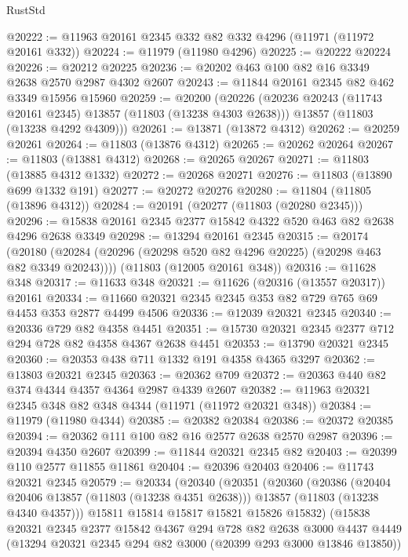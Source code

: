 \begin{lexlean}{RustStd}
\begin{coremodule}
@20222 := @11963 @20161 @2345 @332 @82 @332 @4296 (@11971 (@11972 @20161 @332))
@20224 := @11979 (@11980 @4296)
@20225 := @20222 @20224
@20226 := @20212 @20225
@20236 := @20202 @463 @100 @82 @16 @3349 @2638 @2570 @2987 @4302 @2607
@20243 := @11844 @20161 @2345 @82 @462 @3349 @15956 @15960
@20259 := @20200
    (@20226
      (@20236 @20243 (@11743 @20161 @2345) @13857 (@11803 (@13238 @4303 @2638)))
      @13857
      (@11803 (@13238 @4292 @4309)))
@20261 := @13871 (@13872 @4312)
@20262 := @20259 @20261
@20264 := @11803 (@13876 @4312)
@20265 := @20262 @20264
@20267 := @11803 (@13881 @4312)
@20268 := @20265 @20267
@20271 := @11803 (@13885 @4312 @1332)
@20272 := @20268 @20271
@20276 := @11803 (@13890 @699 @1332 @191)
@20277 := @20272 @20276
@20280 := @11804 (@11805 (@13896 @4312))
@20284 := @20191 (@20277 (@11803 (@20280 @2345)))
@20296 := @15838 @20161 @2345 @2377 @15842 @4322 @520 @463 @82 @2638 @4296 @2638 @3349
@20298 := @13294 @20161 @2345
@20315 := @20174
    (@20180 (@20284 (@20296 (@20298 @520 @82 @4296 @20225) (@20298 @463 @82 @3349 @20243))))
    (@11803 (@12005 @20161 @348))
@20316 := @11628 @348
@20317 := @11633 @348
@20321 := @11626 (@20316 (@13557 @20317)) @20161
@20334 := @11660 @20321 @2345 @2345 @353 @82 @729 @765 @69 @4453 @353 @2877 @4499 @4506
@20336 := @12039 @20321 @2345
@20340 := @20336 @729 @82 @4358 @4451
@20351 := @15730 @20321 @2345 @2377 @712 @294 @728 @82 @4358 @4367 @2638 @4451
@20353 := @13790 @20321 @2345
@20360 := @20353 @438 @711 @1332 @191 @4358 @4365 @3297
@20362 := @13803 @20321 @2345
@20363 := @20362 @709
@20372 := @20363 @440 @82 @374 @4344 @4357 @4364 @2987 @4339 @2607
@20382 := @11963 @20321 @2345 @348 @82 @348 @4344 (@11971 (@11972 @20321 @348))
@20384 := @11979 (@11980 @4344)
@20385 := @20382 @20384
@20386 := @20372 @20385
@20394 := @20362 @111 @100 @82 @16 @2577 @2638 @2570 @2987
@20396 := @20394 @4350 @2607
@20399 := @11844 @20321 @2345 @82
@20403 := @20399 @110 @2577 @11855 @11861
@20404 := @20396 @20403
@20406 := @11743 @20321 @2345
@20579 := @20334
    (@20340
      (@20351
        (@20360
          (@20386
            (@20404 @20406 @13857 (@11803 (@13238 @4351 @2638)))
            @13857
            (@11803 (@13238 @4340 @4357)))
          @15811
          @15814
          @15817
          @15821
          @15826
          @15832)
        (@15838
          @20321
          @2345
          @2377
          @15842
          @4367
          @294
          @728
          @82
          @2638
          @3000
          @4437
          @4449
          (@13294 @20321 @2345 @294 @82 @3000 (@20399 @293 @3000 @13846 @13850))

\end{coremodule}
\end{lexlean}
